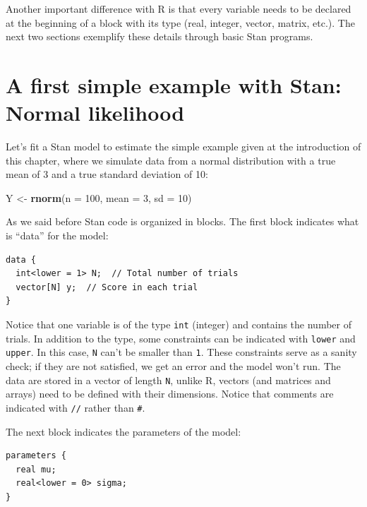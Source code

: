 \documentclass[12pt,]{krantz}
\newenvironment{Shaded}{\begin{snugshade}}{\end{snugshade}}
\newcommand{\DataTypeTok}[1]{\textcolor[rgb]{0.13,0.29,0.53}{#1}}
\newcommand{\DecValTok}[1]{\textcolor[rgb]{0.00,0.00,0.81}{#1}}
\newcommand{\KeywordTok}[1]{\textcolor[rgb]{0.13,0.29,0.53}{\textbf{#1}}}
\newcommand{\NormalTok}[1]{#1}
\newcommand{\StringTok}[1]{\textcolor[rgb]{0.31,0.60,0.02}{#1}}
\theoremstyle{definition}
\theoremstyle{definition}
\theoremstyle{definition}
\theoremstyle{remark}
\begin{document}
Another important difference with R is that every variable needs to be declared at the beginning of a block with its type (real, integer, vector, matrix, etc.). The next two sections exemplify these details through basic Stan programs.

\hypertarget{sec:firststan}{%
\section{A first simple example with Stan: Normal likelihood}\label{sec:firststan}}

Let's fit a Stan model to estimate the simple example given at the introduction of this chapter, where we simulate data from a normal distribution with a true mean of 3 and a true standard deviation of 10:

\begin{Shaded}
\begin{Highlighting}[]
\NormalTok{Y <-}\StringTok{ }\KeywordTok{rnorm}\NormalTok{(}\DataTypeTok{n =} \DecValTok{100}\NormalTok{, }\DataTypeTok{mean =} \DecValTok{3}\NormalTok{, }\DataTypeTok{sd =} \DecValTok{10}\NormalTok{)}
\end{Highlighting}
\end{Shaded}

As we said before Stan code is organized in blocks. The first block indicates what is ``data'' for the model:

\begin{verbatim}
data {
  int<lower = 1> N;  // Total number of trials
  vector[N] y;  // Score in each trial
}
\end{verbatim}

Notice that one variable is of the type \texttt{int} (integer) and contains the number of trials. In addition to the type, some constraints can be indicated with \texttt{lower} and \texttt{upper}. In this case, \texttt{N} can't be smaller than \texttt{1}. These constraints serve as a sanity check; if they are not satisfied, we get an error and the model won't run. The data are stored in a vector of length \texttt{N}, unlike R, vectors (and matrices and arrays) need to be defined with their dimensions. Notice that comments are indicated with \texttt{//} rather than \texttt{\#}.

The next block indicates the parameters of the model:

\begin{verbatim}
parameters {
  real mu;
  real<lower = 0> sigma;
}
\end{verbatim}
\end{document}
